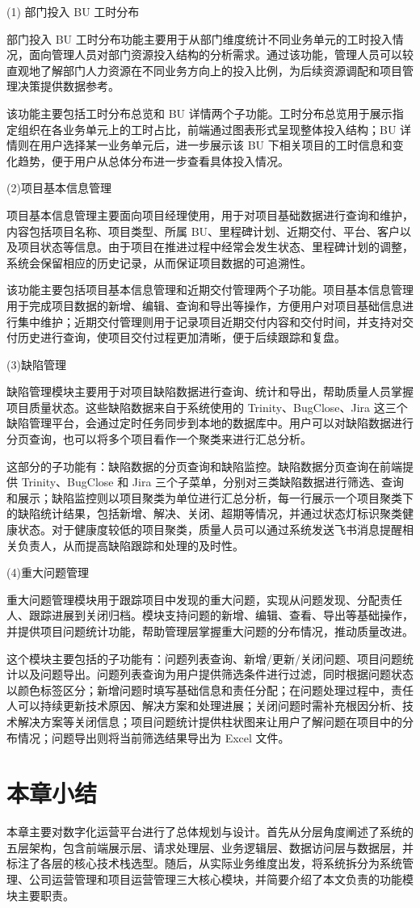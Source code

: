 (1) 部门投入 BU 工时分布

部门投入 BU 工时分布功能主要用于从部门维度统计不同业务单元的工时投入情况，面向管理人员对部门资源投入结构的分析需求。通过该功能，管理人员可以较直观地了解部门人力资源在不同业务方向上的投入比例，为后续资源调配和项目管理决策提供数据参考。

该功能主要包括工时分布总览和 BU 详情两个子功能。工时分布总览用于展示指定组织在各业务单元上的工时占比，前端通过图表形式呈现整体投入结构；BU 详情则在用户选择某一业务单元后，进一步展示该 BU 下相关项目的工时信息和变化趋势，便于用户从总体分布进一步查看具体投入情况。

(2)项目基本信息管理

项目基本信息管理主要面向项目经理使用，用于对项目基础数据进行查询和维护，内容包括项目名称、项目类型、所属 BU、里程碑计划、近期交付、平台、客户以及项目状态等信息。由于项目在推进过程中经常会发生状态、里程碑计划的调整，系统会保留相应的历史记录，从而保证项目数据的可追溯性。

该功能主要包括项目基本信息管理和近期交付管理两个子功能。项目基本信息管理用于完成项目数据的新增、编辑、查询和导出等操作，方便用户对项目基础信息进行集中维护；近期交付管理则用于记录项目近期交付内容和交付时间，并支持对交付历史进行查询，使项目交付过程更加清晰，便于后续跟踪和复盘。

(3)缺陷管理

缺陷管理模块主要用于对项目缺陷数据进行查询、统计和导出，帮助质量人员掌握项目质量状态。这些缺陷数据来自于系统使用的 Trinity、BugClose、Jira 这三个缺陷管理平台，会通过定时任务同步到本地的数据库中。用户可以对缺陷数据进行分页查询，也可以将多个项目看作一个聚类来进行汇总分析。

这部分的子功能有：缺陷数据的分页查询和缺陷监控。缺陷数据分页查询在前端提供 Trinity、BugClose 和 Jira 三个子菜单，分别对三类缺陷数据进行筛选、查询和展示；缺陷监控则以项目聚类为单位进行汇总分析，每一行展示一个项目聚类下的缺陷统计结果，包括新增、解决、关闭、超期等情况，并通过状态灯标识聚类健康状态。对于健康度较低的项目聚类，质量人员可以通过系统发送飞书消息提醒相关负责人，从而提高缺陷跟踪和处理的及时性。

(4)重大问题管理

重大问题管理模块用于跟踪项目中发现的重大问题，实现从问题发现、分配责任人、跟踪进展到关闭归档。模块支持问题的新增、编辑、查看、导出等基础操作，并提供项目问题统计功能，帮助管理层掌握重大问题的分布情况，推动质量改进。

这个模块主要包括的子功能有：问题列表查询、新增/更新/关闭问题、项目问题统计以及问题导出。问题列表查询为用户提供筛选条件进行过滤，同时根据问题状态以颜色标签区分；新增问题时填写基础信息和责任分配；在问题处理过程中，责任人可以持续更新技术原因、解决方案和处理进展；关闭问题时需补充根因分析、技术解决方案等关闭信息；项目问题统计提供柱状图来让用户了解问题在项目中的分布情况；问题导出则将当前筛选结果导出为 Excel 文件。

\section{本章小结}
本章主要对数字化运营平台进行了总体规划与设计。首先从分层角度阐述了系统的五层架构，包含前端展示层、请求处理层、业务逻辑层、数据访问层与数据层，并标注了各层的核心技术栈选型。随后，从实际业务维度出发，将系统拆分为系统管理、公司运营管理和项目运营管理三大核心模块，并简要介绍了本文负责的功能模块主要职责。

